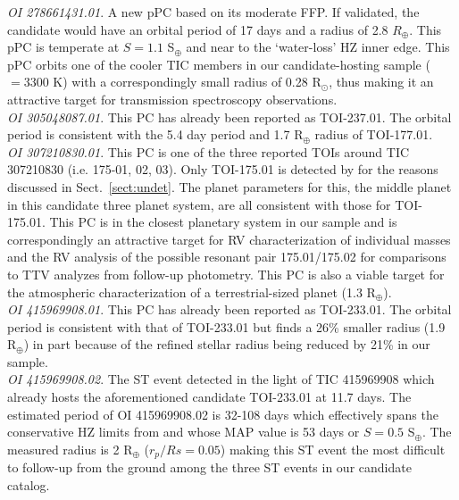 \emph{OI 278661431.01}. A new pPC based on its moderate FFP. If validated, the candidate
would have an orbital period of 17 days and a radius of 2.8 $R_{\oplus}$. This pPC is temperate
at $S=1.1$ S$_{\oplus}$ and near to the `water-loss' HZ inner edge. This pPC orbits one of the
cooler TIC members in our candidate-hosting sample (\teff{} $=3300$ K) with a correspondingly small
radius of 0.28 R$_{\odot}$, thus making it an attractive target for transmission spectroscopy
observations. \\

\emph{OI 305048087.01}. This PC has already been reported as TOI-237.01. The \pipeline{} orbital
period is consistent with the 5.4 day period and 1.7 R$_{\oplus}$ radius of TOI-177.01. \\

\emph{OI 307210830.01}. This PC is one of the three reported TOIs around TIC 307210830 (i.e. 175-01,
02, 03). Only TOI-175.01 is detected by \pipeline{} for the reasons discussed in Sect.~\ref{sect:undet}.
The \pipeline{} planet parameters for this, the middle planet in this candidate three planet
system, are all consistent with those for TOI-175.01. This PC is in the closest planetary system
in our sample and is correspondingly an attractive target for RV characterization of individual masses
and the RV analysis of the  possible resonant pair 175.01/175.02 for comparisons to TTV analyzes
from follow-up photometry. This PC is also a viable target for the atmospheric characterization of
a terrestrial-sized planet (1.3 R$_{\oplus}$). \\

\emph{OI 415969908.01}. This PC has already been reported as TOI-233.01. The \pipeline{} orbital
period is consistent with that of TOI-233.01 but finds a 26\% smaller radius (1.9 R$_{\oplus}$)
in part because of the refined stellar radius being reduced by 21\% in our sample. \\

\emph{OI 415969908.02}. The ST event detected in the light of TIC 415969908 which already
hosts the aforementioned candidate TOI-233.01 at 11.7 days. The estimated period of OI 415969908.02 is 32-108 days
which effectively spans the conservative HZ limits from \cite{kopparapu13} and whose MAP value is
53 days or $S=0.5$ S$_{\oplus}$. The measured radius is 2 R$_{\oplus}$ ($r_p/Rs=0.05$) making this
ST event the most difficult to follow-up from the ground among the three ST events in our candidate
catalog. \\

